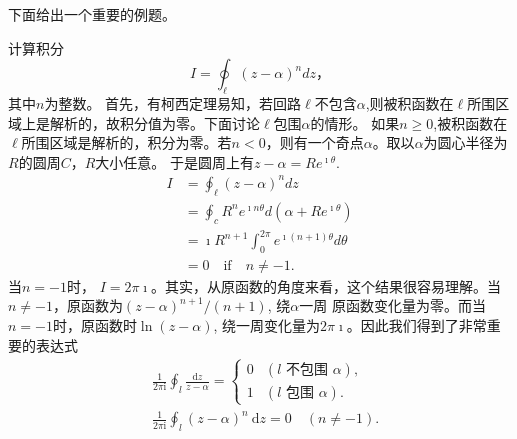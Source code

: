下面给出一个重要的例题。
\begin{examplebox}{计算积分\[ I = \oint_\ell (z-\alpha)^n dz， \]其中$n$为整数。}
首先，有柯西定理易知，若回路$\ell$不包含$\alpha$,则被积函数在$\ell$所围区域上是解析的，故积分值为零。下面讨论$\ell$包围$\alpha$的情形。
如果$n\geq 0$,被积函数在$\ell$所围区域是解析的，积分为零。若$n<0$，则有一个奇点$\alpha$。取以$\alpha$为圆心半径为$R$的圆周$C$，$R$大小任意。
于是圆周上有$z-\alpha = Re^{\imath \theta}$.
\begin{equation}
\begin{aligned}
    I &= \oint_\ell (z-\alpha)^n dz\\
     &= \oint_c R^n e^{\imath n \theta} d (\alpha + R e^{\imath \theta})\\
     & =  \imath R^{n+1} \int_0^{2\pi} e^{\imath (n+1)\theta}  d\theta \\
     & = 0 \quad \textrm{if} \quad n\neq -1.
\end{aligned}
\end{equation}
当$n = -1$时， $I = 2\pi \imath$。其实，从原函数的角度来看，这个结果很容易理解。当$n\neq -1$，原函数为$(z-\alpha)^{n+1}/(n+1)$, 绕$\alpha$一周
原函数变化量为零。而当$n=-1$时，原函数时$\ln(z-\alpha)$, 绕一周变化量为$2\pi \imath$。因此我们得到了非常重要的表达式
\begin{equation}
    \begin{aligned}
        & \frac{1}{2 \pi \mathrm{i}} \oint_l \frac{\mathrm{d} z}{z-\alpha}= \begin{cases}0 & (l \text { 不包围 } \alpha), \\
        1 & (l \text { 包围 } \alpha) . \end{cases} \\
        & \frac{1}{2 \pi \mathrm{i}} \oint_l(z-\alpha)^n \mathrm{~d} z=0 \quad(n \neq-1) .
        \end{aligned}
\end{equation}
\end{examplebox}